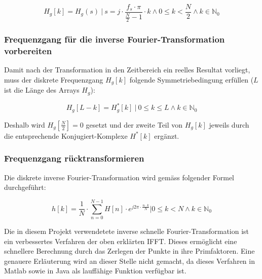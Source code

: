 \begin{equation}
    H_g[k] = H_g(s) ~\biggr \rvert~ s=j \cdot \frac{f_s \cdot \pi}{\frac{N}{2} - 1} \cdot k \land 0 \leq k < \frac{N}{2} \land k \in \mathbb{N}_0
\end{equation}


\subsubsection*{Frequenzgang f\"ur die inverse Fourier-Transformation vorbereiten}
Damit  nach  der  Transformation  in  den  Zeitbereich  ein  reelles  Resultat
vorliegt, muss der diskrete  Frequenzgang $H_g[k]$ folgende Symmetriebedingung
erf\"ullen ($L$ ist die L\"ange des Arrays $H_g$):

\begin{equation}
    H_g[L-k]=H_g^*[k]  ~\biggr \rvert~ 0 \leq k \leq L \land k \in \mathbb{N}_0
\end{equation}

Deshalb wird $H_g[\frac{N}{2}]  = 0$ gesetzt und der zweite  Teil von $H_g[k]$
jeweils durch die entsprechende Konjugiert-Komplexe $H^*[k]$ erg\"anzt.

\subsubsection*{Frequenzgang r\"ucktransformieren}
Die  diskrete inverse  Fourier-Transformation wird  gem\"ass folgender  Formel
durchgef\"uhrt:

\begin{equation}
    h[k]  = \frac{1}{N}  \cdot \displaystyle\sum_{n=0}^{N-1}  H[n] \cdot
    e^{j 2\pi \cdot \frac{n \cdot k}{N}} \biggr \rvert 0 \leq k < N \land k \in \mathbb{N}_0
\end{equation}

Die in diesem Projekt verwendetete inverse schnelle Fourier-Transformation ist
ein  verbessertes Verfahren  der oben  erkl\"arten IFFT.   Dieses erm\"oglicht
eine   schnellere  Berechnung   durch  das   Zerlegen  der   Punkte  in   ihre
Primfaktoren. Eine genauere Erl\"auterung wird an dieser Stelle nicht gemacht,
da  dieses  Verfahren  in  Matlab  sowie in  Java  als  lauff\"ahige  Funktion
verf\"ugbar ist.



